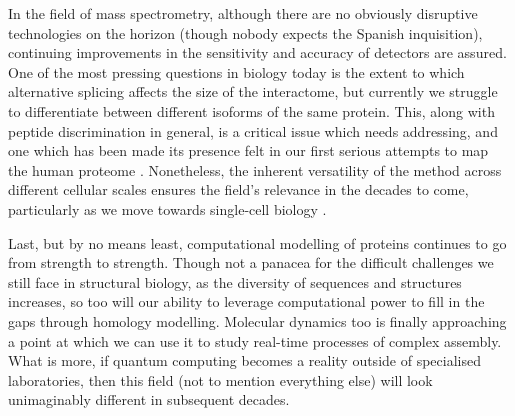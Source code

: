 \documentclass[a4paper,11pt,twoside,openright]{scrbook}
\begin{document}
In the field of mass spectrometry, although there are no obviously disruptive technologies on the horizon (though nobody expects the Spanish inquisition), continuing improvements in the sensitivity and accuracy of detectors are assured. One of the most pressing questions in biology today is the extent to which alternative splicing affects the size of the interactome, but currently we struggle to differentiate between different isoforms of the same protein. This, along with peptide discrimination in general, is a critical issue which needs addressing, and one which has been made its presence felt in our first serious attempts to map the human proteome \cite{Kim2014,Wilhelm2014,Ezkurdia2014}. Nonetheless, the inherent versatility of the method across different cellular scales ensures the field's relevance in the decades to come, particularly as we move towards single-cell biology \cite{Macaulay2017}.

Last, but by no means least, computational modelling of proteins continues to go from strength to strength. Though not a panacea for the difficult challenges we still face in structural biology, as the diversity of sequences and structures increases, so too will our ability to leverage computational power to fill in the gaps through homology modelling. Molecular dynamics too is finally approaching a point at which we can use it to study real-time processes of complex assembly. What is more, if quantum computing becomes a reality outside of specialised laboratories, then this field (not to mention everything else) will look unimaginably different in subsequent decades.

\printbibliography
\end{document}
